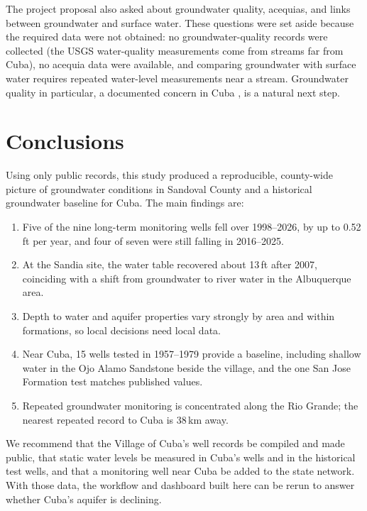 \documentclass[10pt,twocolumn,letterpaper]{article}
\begin{document}
The project proposal also asked about groundwater quality, acequias, and links between groundwater
and surface water. These questions were set aside because the required data were not obtained: no
groundwater-quality records were collected (the USGS water-quality measurements come from streams far
from Cuba), no acequia data were available, and comparing groundwater with surface water requires
repeated water-level measurements near a stream. Groundwater quality in particular, a documented
concern in Cuba \citep{hollinshead2021}, is a natural next step.

\section{Conclusions}\label{sec:conclusions}
Using only public records, this study produced a reproducible, county-wide picture of groundwater
conditions in Sandoval County and a historical groundwater baseline for Cuba. The main findings are:
\begin{enumerate}[leftmargin=1.4em]
  \item Five of the nine long-term monitoring wells fell over 1998--2026, by up to 0.52\,ft per
        year, and four of seven were still falling in 2016--2025.
  \item At the Sandia site, the water table recovered about 13\,ft after 2007, coinciding with a
        shift from groundwater to river water in the Albuquerque area.
  \item Depth to water and aquifer properties vary strongly by area and within formations, so local
        decisions need local data.
  \item Near Cuba, 15 wells tested in 1957--1979 provide a baseline, including shallow water in the
        Ojo Alamo Sandstone beside the village, and the one San Jose Formation test matches published
        values.
  \item Repeated groundwater monitoring is concentrated along the Rio Grande; the nearest repeated
        record to Cuba is 38\,km away.
\end{enumerate}
We recommend that the Village of Cuba's well records be compiled and made public, that static water
levels be measured in Cuba's wells and in the historical test wells, and that a monitoring well near
Cuba be added to the state network. With those data, the workflow and dashboard built here can be
rerun to answer whether Cuba's aquifer is declining.
\end{document}
